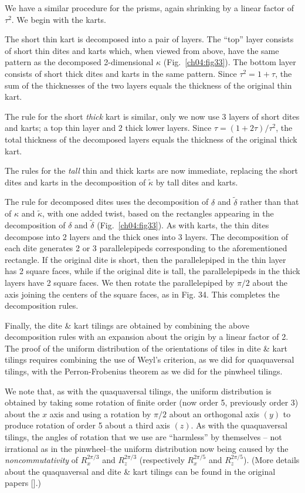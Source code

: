 \documentclass[reqno]{stml-l}
\theoremstyle{plain}
\theoremstyle{definition}
\numberwithin{equation}{chapter}
\begin{document}
We have a similar procedure for the prisms, again shrinking by a linear factor of $\tau^{2}$. We begin with the karts.

The short thin kart is decomposed into a pair of layers. The ``top'' layer consists of short thin dites and karts which, when viewed from above, have the same pattern as the decomposed 2-dimensional $\kappa$ (Fig.~\ref{ch04:fig33}). The bottom layer consists of short thick dites and karts in the same pattern. Since $\tau^{2}=1+\tau$, the sum of the thicknesses of the two layers equals the thickness of the original thin kart.

The rule for the short \emph{thick} kart is similar, only we now use 3 layers of short dites and karts; a top thin layer and 2 thick lower layers. Since $\tau=(1+2\tau)/\tau^{2}$, the total thickness of the decomposed layers equals the thickness of the original thick kart.

The rules for the \emph{tall} thin and thick karts are now immediate, replacing the short dites and karts in the decomposition of $\tilde{\kappa}$ by tall dites and karts.

The rule for decomposed dites uses the decomposition of $\delta$ and $\tilde{\delta}$ rather than that of $\kappa$ and $\tilde{\kappa}$, with one added twist, based on the rectangles appearing in the decomposition of $\delta$ and $\tilde{\delta}$ (Fig.~\ref{ch04:fig33}). As with karts, the thin dites decompose into 2 layers and the thick ones into 3 layers. The decomposition of each dite generates 2 or 3 parallelepipeds corresponding to the aforementioned rectangle. If the original dite is short, then the parallelepiped in the thin layer has 2 square faces, while if the original dite is tall, the parallelepipeds in the thick layers have 2 square faces. We then rotate the parallelepiped by $\pi/2$ about the axis joining the centers of the square faces, as in Fig. 34. This completes the decomposition rules.

Finally, the dite \& kart tilings are obtained by combining the above decomposition rules with an expansion about the origin by a linear factor of 2. The proof of the uniform distribution of the orientations of tiles in dite \& kart tilings requires combining the use of Weyl's criterion, as we did for quaquaversal tilings, with the Perron-Frobenius theorem as we did for the pinwheel tilings.

We note that, as with the quaquaversal tilings, the uniform distribution is obtained by taking some rotation of finite order (now order 5, previously order 3) about the $x$ axis and using a rotation by $\pi/2$ about an orthogonal axis $(y)$ to produce rotation of order 5 about a third axis $(z)$. As with the quaquaversal tilings, the angles of rotation that we use are ``harmless'' by themselves -- not irrational as in the pinwheel--the uniform distribution now being caused by the \emph{noncommutativity} of $R_{x}^{2\pi/3}$ and $R_{z}^{2\pi/3}$ (respectively $R_{x}^{2\pi/5}$ and $R_{z}^{2\pi/5}$). (More details about the quaquaversal and dite \& kart tilings can be found in the original papers [].)
\end{document}
